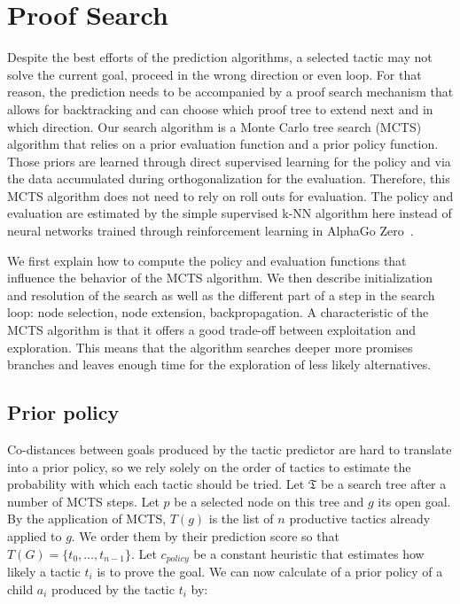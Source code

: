 \documentclass[runningheads,a4paper,draft]{svjour3}
\begin{document}
\section{Proof Search}\label{sec:proofsearch}
Despite the best efforts of the prediction algorithms, a selected tactic may 
not solve the current goal, proceed in the wrong direction
or even loop. For that reason, the prediction needs to be accompanied by a  
proof search mechanism that allows for backtracking and 
can choose which proof tree to extend next and in which direction.
Our search algorithm is a Monte Carlo tree search (MCTS) algorithm that relies 
on a prior evaluation function and a prior policy function. Those priors are 
learned through direct supervised learning for the policy and via the data 
accumulated during orthogonalization for the evaluation. Therefore, this MCTS 
algorithm does not need to rely on roll outs for evaluation. The 
policy and evaluation are estimated by the simple supervised k-NN algorithm 
here instead of neural networks trained through reinforcement learning in 
AlphaGo Zero~\cite{silver2017mastering}. 

We first explain how to compute the policy and evaluation functions that 
influence the behavior of the MCTS algorithm.
We then describe initialization and resolution of the search as well as the 
different part of a step in the search loop: node selection, node 
extension, backpropagation.
A characteristic of the MCTS algorithm is that it offers a good trade-off 
between exploitation and exploration. This means that the algorithm searches
deeper more promises branches and leaves enough time for the exploration 
of less likely alternatives.


\subsection{Prior policy}\label{sec:policy}
Co-distances between goals produced by the tactic predictor are hard 
to translate into a prior policy, so we rely solely on the order of 
tactics to estimate the probability with which each tactic should be tried.
Let $\mathfrak{T}$ be a search tree after a number of MCTS steps.
Let $p$ be a selected node on this tree and $g$ its open goal. By the 
application of MCTS, $T(g)$ is the list of $n$ productive tactics already 
applied to $g$. We order them by their prediction score so that $T(G)= \lbrace 
t_0,\ldots,t_{n-1} \rbrace$. 
Let $c_{policy}$ be a constant heuristic that estimates how likely a tactic 
$t_i$ is to prove the goal. 
We can now calculate of a prior policy of a child $a_i$ produced by the tactic 
$t_i$ by:
\end{document}
